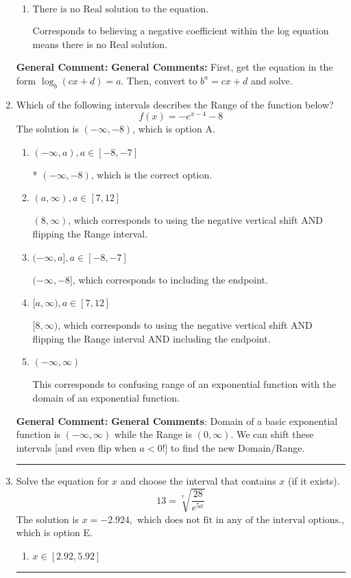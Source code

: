 \documentclass{extbook}[14pt]
\newcommand{\litem}[1]{\item #1

\rule{\textwidth}{0.4pt}}
\begin{document}
\begin{enumerate}
{\begin{enumerate}[label=\Alph*.]
$x = 62.250$, which corresponds to reversing the base and exponent when converting.
\item \( \text{There is no Real solution to the equation.} \)

Corresponds to believing a negative coefficient within the log equation means there is no Real solution.
\end{enumerate}

\textbf{General Comment:} \textbf{General Comments:} First, get the equation in the form $\log_b{(cx+d)} = a$. Then, convert to $b^a = cx+d$ and solve.
}
\litem{
Which of the following intervals describes the Range of the function below?
\[ f(x) = -e^{x-4}-8 \]The solution is \( (-\infty, -8) \), which is option A.\begin{enumerate}[label=\Alph*.]
\item \( (-\infty, a), a \in [-8, -7] \)

* $(-\infty, -8)$, which is the correct option.
\item \( (a, \infty), a \in [7, 12] \)

$(8, \infty)$, which corresponds to using the negative vertical shift AND flipping the Range interval.
\item \( (-\infty, a], a \in [-8, -7] \)

$(-\infty, -8]$, which corresponds to including the endpoint.
\item \( [a, \infty), a \in [7, 12] \)

$[8, \infty)$, which corresponds to using the negative vertical shift AND flipping the Range interval AND including the endpoint.
\item \( (-\infty, \infty) \)

This corresponds to confusing range of an exponential function with the domain of an exponential function.
\end{enumerate}

\textbf{General Comment:} \textbf{General Comments}: Domain of a basic exponential function is $(-\infty, \infty)$ while the Range is $(0, \infty)$. We can shift these intervals [and even flip when $a<0$!] to find the new Domain/Range.
}
\litem{
 Solve the equation for $x$ and choose the interval that contains $x$ (if it exists).
\[  13 = \sqrt[7]{\frac{28}{e^{5x}}} \]The solution is \( x = -2.924, \text{ which does not fit in any of the interval options.} \), which is option E.\begin{enumerate}[label=\Alph*.]
\item \( x \in [2.92, 5.92] \)


\end{enumerate}}
\end{enumerate}
\end{document}
